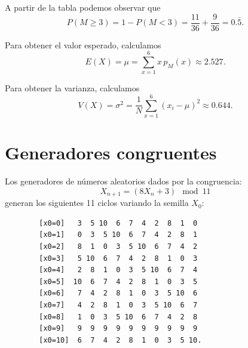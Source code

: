 \documentclass[11pt,letterpaper]{article}
\begin{document}
	A partir de la tabla podemos observar que 
	\[
	P(M \geq 3) = 1 - P(M < 3) = \frac{11}{36} + \frac{9}{36} = 0.\bar{5}.
	\]
	
	Para obtener el valor esperado, calculamos
	\[
	E(X) = \mu = \sum_{x = 1}^{6} x\,p_M(x) \approx 2.527.
	\]
	
	Para obtener la varianza, calculamos
	\[
	V(X) = \sigma^2 = \frac{1}{N} \sum_{x = 1}^{6} (x_i - \mu)^2 \approx 0.644.
	\]
	
	\section{Generadores congruentes}
	Los generadores de números aleatorios dados por la congruencia:
	\[
	X_{n+1} = (8X_n + 3) \mod 11
	\]
	generan los siguientes 11 ciclos variando la semilla $X_0$:

	\begin{verbatim}
		[x0=0]   3  5 10  6  7  4  2  8  1  0
		[x0=1]   0  3  5 10  6  7  4  2  8  1
		[x0=2]   8  1  0  3  5 10  6  7  4  2
		[x0=3]   5 10  6  7  4  2  8  1  0  3
		[x0=4]   2  8  1  0  3  5 10  6  7  4
		[x0=5]  10  6  7  4  2  8  1  0  3  5
		[x0=6]   7  4  2  8  1  0  3  5 10  6
		[x0=7]   4  2  8  1  0  3  5 10  6  7
		[x0=8]   1  0  3  5 10  6  7  4  2  8
		[x0=9]   9  9  9  9  9  9  9  9  9  9
		[x0=10]  6  7  4  2  8  1  0  3  5 10.
	\end{verbatim}
	
\end{document}
